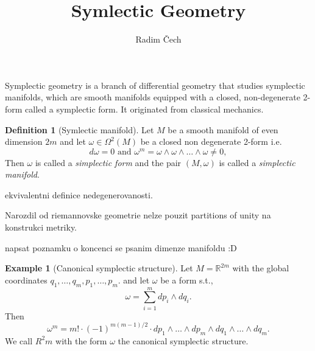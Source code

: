 \documentclass{article}
\title{Symlectic Geometry}
\author{Radim Čech}
\theoremstyle{definition}
\newtheorem{definition}[theorem]{Definition}
\newtheorem{example}[theorem]{Example}
\begin{document}
\maketitle

\noindent Symplectic geometry is a branch of differential geometry that studies symplectic manifolds, which are smooth manifolds equipped with a closed, non-degenerate 2-form called a symplectic form. It originated from classical mechanics.

\begin{definition}[Symlectic manifold]
    Let $M$ be a smooth manifold of even dimension $2m$ and let $\omega \in \Omega^2(M)$ be a closed non degenerate 2-form i.e.
    \begin{equation*}
        d\omega = 0 \text{ and } \omega^m = \omega \wedge \omega \wedge \dots \wedge \omega \not = 0,
    \end{equation*}
    Then $\omega$ is called a \textit{simplectic form} and the pair $(M, \omega)$ is called a \textit{simplectic manifold}.
\end{definition}

ekvivalentni definice nedegenerovanosti.

Narozdil od riemannovske geometrie nelze pouzit partitions of unity na konstrukci metriky.

napsat poznamku o koncenci se psanim dimenze manifoldu :D


\begin{example}[Canonical symplectic structure]
    Let $M = \mathbb{R}^{2m}$ with the global coordinates ${q_1, \dots, q_m, p_1, \dots, p_m}$. and let $\omega$ be a form s.t., 
    \begin{equation*}
        \omega = \sum_{i=1}^m dp_i \wedge dq_i.
    \end{equation*}
    Then 
    \begin{equation*}
        \omega^m = m! \cdot (-1)^{m(m-1)/2} \cdot dp_1 \wedge \dots \wedge dp_m \wedge dq_1 \wedge \dots \wedge dq_m.
    \end{equation*}
    We call $R^2m$ with the form $\omega$ the canonical symplectic structure.
\end{example}
\end{document}
